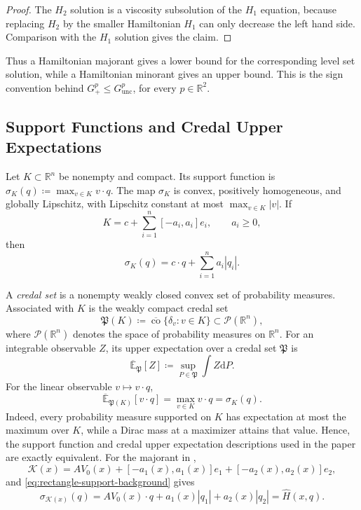 \documentclass[11pt,reqno,noamsfonts]{amsart}
\theoremstyle{definition}
\theoremstyle{remark}
\newcommand{\R}{\mathbb R}
\newcommand{\Pp}{\mathcal P}
\newcommand{\clco}{\overline{\operatorname{co}}}
\newcommand{\Hhat}{\widehat H}
\newcommand{\upperE}{\overline{\mathbb E}}
\begin{document}
\begin{proof}
The $H_2$ solution is a viscosity subsolution of the $H_1$ equation, because replacing $H_2$ by the smaller Hamiltonian $H_1$ can only decrease the left hand side. Comparison with the $H_1$ solution gives the claim.
\end{proof}

Thus a Hamiltonian majorant gives a lower bound for the corresponding level set solution, while a Hamiltonian minorant gives an upper bound. This is the sign convention behind
  $G_+^p\le G_{\mathrm{unc}}^p$, 
  for every $p\in\mathbb R^2$.

\subsection{Support Functions and Credal Upper Expectations}\label{app:credal-background}

Let $K\subset\R^n$ be nonempty and compact. Its support function is
  $\sigma_K(q)\coloneqq \max_{v\in K}v\cdot q$.
The map $\sigma_K$ is convex, positively homogeneous, and globally Lipschitz, with Lipschitz constant at most $\max_{v\in K}|v|$. If
\[
  K=c+\sum_{i=1}^n[-a_i,a_i]e_i,
  \qquad a_i\ge0,
\]
then
\begin{equation}\label{eq:rectangle-support-background}
  \sigma_K(q)=c\cdot q+\sum_{i=1}^n a_i|q_i|.
\end{equation}

A \emph{credal set} is a nonempty weakly closed convex set of probability measures. Associated with $K$ is the weakly compact credal set
\[
  \mathfrak P(K)
  \coloneqq \clco\{\delta_v:v\in K\}
  \subset\Pp(\R^n),
\]
where $\Pp(\R^n)$ denotes the space of probability measures on $\R^n$. For an integrable observable $Z$, its upper expectation over a credal set $\mathfrak P$ is
\[
  \upperE_{\mathfrak P}[Z]
  \coloneqq \sup_{P\in\mathfrak P}\int Z \mathrm dP.
\]
For the linear observable $v\mapsto v\cdot q$,
\begin{equation*}
  \upperE_{\mathfrak P(K)}[v\cdot q]
  =\max_{v\in K}v\cdot q
  =\sigma_K(q).
\end{equation*}
Indeed, every probability measure supported on $K$ has expectation at most the maximum over $K$, while a Dirac mass at a maximizer attains that value. Hence, the support function and credal upper expectation descriptions used in the paper are exactly equivalent.
For the majorant in ,
\[
  \mathcal K(x)
  =A V_0(x)
   +[-a_1(x),a_1(x)]e_1
   +[-a_2(x),a_2(x)]e_2,
\]
and \eqref{eq:rectangle-support-background} gives
\[
  \sigma_{\mathcal K(x)}(q)
  =A V_0(x)\cdot q+a_1(x)|q_1|+a_2(x)|q_2|
  =\Hhat(x,q).
\]
\end{document}
